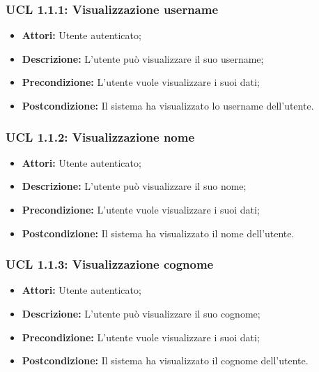 \hypertarget{L1.1.1}{}
\subsubsection{UCL 1.1.1: Visualizzazione username}
\begin{itemize}
	\item \textbf{Attori:} Utente autenticato;
	\item \textbf{Descrizione:} L'utente può visualizzare il suo username;
	\item \textbf{Precondizione:} L'utente vuole visualizzare i suoi dati;
\item \textbf{Postcondizione:} Il sistema ha visualizzato lo username dell'utente.
\end{itemize}

\hypertarget{L1.1.2}{}
\subsubsection{UCL 1.1.2: Visualizzazione nome}
\begin{itemize}
	\item \textbf{Attori:} Utente autenticato;
	\item \textbf{Descrizione:} L'utente può visualizzare il suo nome;
	\item \textbf{Precondizione:} L'utente vuole visualizzare i suoi dati;
	\item \textbf{Postcondizione:} Il sistema ha visualizzato il nome dell'utente.
\end{itemize}

\hypertarget{L1.1.3}{}
\subsubsection{UCL 1.1.3: Visualizzazione cognome}
\begin{itemize}
	\item \textbf{Attori:} Utente autenticato;
	\item \textbf{Descrizione:} L'utente può visualizzare il suo cognome;
	\item \textbf{Precondizione:} L'utente vuole visualizzare i suoi dati;
	\item \textbf{Postcondizione:} Il sistema ha visualizzato il cognome dell'utente.
\end{itemize}

